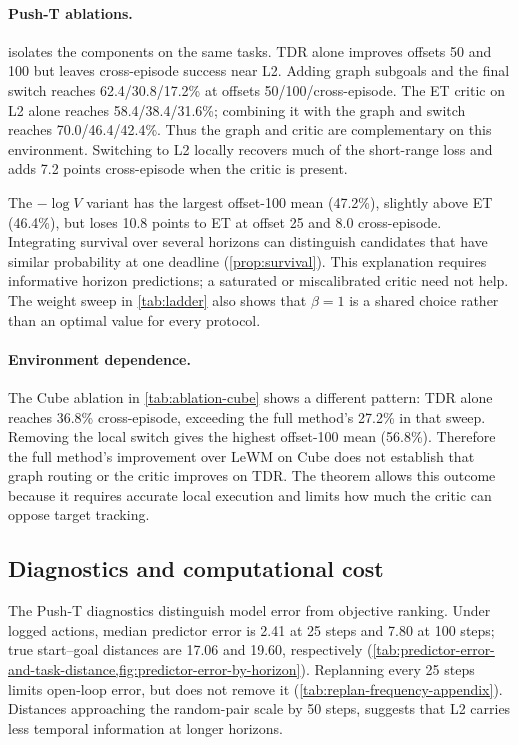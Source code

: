 \documentclass{article}
\theoremstyle{definition}
\theoremstyle{remark}
\begin{document}
\paragraph{Push-T ablations.}
\label{sec:ablation}
 isolates the components on the same tasks.
TDR alone improves offsets 50 and 100 but leaves cross-episode success near L2.
Adding graph subgoals and the final switch reaches 62.4/30.8/17.2\% at
offsets 50/100/cross-episode. The ET critic on L2 alone reaches 58.4/38.4/31.6\%;
combining it with the graph and switch reaches 70.0/46.4/42.4\%.
Thus the graph and critic are complementary on this environment.
Switching to L2 locally recovers much of the short-range loss and adds 7.2 points
cross-episode when the critic is present.

The $-\log V$ variant has the largest offset-100 mean (47.2\%), slightly above
ET (46.4\%), but loses 10.8 points to ET at offset 25 and 8.0 cross-episode.
Integrating survival over several horizons can distinguish candidates that have
similar probability at one deadline (\cref{prop:survival}).
This explanation requires informative horizon predictions; a saturated or miscalibrated
critic need not help. The weight sweep in \cref{tab:ladder} also shows that
$\beta=1$ is a shared choice rather than an optimal value for every protocol.

\paragraph{Environment dependence.}
The Cube ablation in \cref{tab:ablation-cube} shows a different pattern:
TDR alone reaches 36.8\% cross-episode, exceeding the full method's 27.2\% in that sweep.
Removing the local switch gives the highest offset-100 mean (56.8\%).
Therefore the full method's improvement over LeWM on Cube does not establish that
graph routing or the critic improves on TDR. The theorem allows this outcome because
it requires accurate local execution and limits how much the critic can oppose target tracking.

\subsection{Diagnostics and computational cost}
\label{sec:analysis}
\label{sec:problem}
The Push-T diagnostics distinguish model error from objective ranking.
Under logged actions, median predictor error is 2.41 at 25 steps and 7.80 at
100 steps; true start--goal distances are 17.06 and 19.60, respectively
(\cref{tab:predictor-error-and-task-distance,fig:predictor-error-by-horizon}).
Replanning every 25 steps limits open-loop error, but does not remove it (\cref{tab:replan-frequency-appendix}).
Distances approaching the random-pair scale by 50 steps, suggests that L2 carries
less temporal information at longer horizons.
\end{document}
